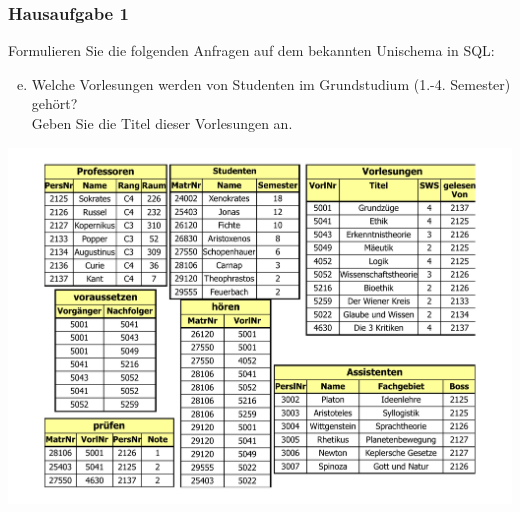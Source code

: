 \begin{frame}[fragile]
	\frametitle{Hausaufgabe 1}
	\vspace{0.25cm}

	\begin{multicols}{2}
		Formulieren Sie die folgenden Anfragen auf dem bekannten Unischema in SQL:
		\begin{enumerate}[a)]
			\setcounter{enumi}{4}
			\item Welche Vorlesungen werden von Studenten im Grundstudium (1.-4. Semester) gehört? \\
			      Geben Sie die Titel dieser Vorlesungen an.
		\end{enumerate}
		\vfill\columnbreak

		\begin{center}
			\includegraphics[height=.6\paperheight]{../img/uni.pdf}
		\end{center}
	\end{multicols}
\end{frame}

